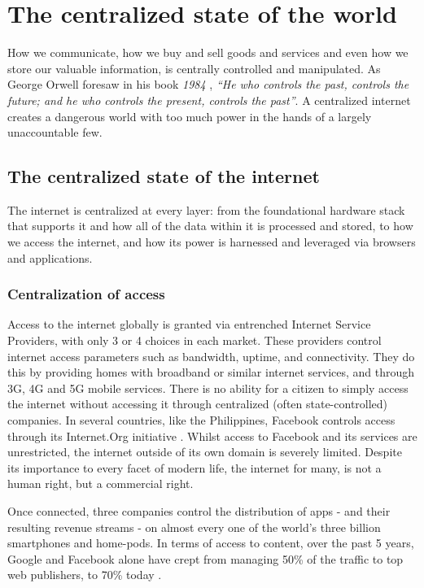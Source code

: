 \section{The centralized state of the world}
\label{sec:intro}
How we communicate, how we buy and sell goods and services and even how we store our valuable information, is centrally controlled and manipulated. As George Orwell foresaw in his book \textit{1984} \cite{orwell2009nineteen}, \textit{``He who controls the past, controls the future; and he who controls the present, controls the past''}. A centralized internet creates a dangerous world with too much power in the hands of a largely unaccountable few.


\subsection{The centralized state of the internet}
\label{sec:introInternet}
The internet is centralized at every layer: from the foundational hardware stack that supports it and how all of the data within it is processed and stored, to how we access the internet, and how its power is harnessed and leveraged via browsers and applications.

\subsubsection{Centralization of access}
\label{sec:introaccess}
Access to the internet globally is granted via entrenched Internet Service Providers, with only 3 or 4 choices in each market. These providers control internet access parameters such as bandwidth, uptime, and connectivity. They do this by providing homes with broadband or similar internet services, and through 3G, 4G and 5G mobile services. There is no ability for a citizen to simply access the internet without accessing it through centralized (often state-controlled) companies. In several countries, like the Philippines, Facebook controls access through its Internet.Org initiative \cite{SoftpediaFace}. Whilst access to Facebook and its services are unrestricted, the internet outside of its own domain is severely limited. Despite its importance to every facet of modern life, the internet for many, is not a human right, but a commercial right.

Once connected, three companies control the distribution of apps - and their resulting revenue streams - on almost every one of the world's three billion smartphones and home-pods. In terms of access to content, over the past 5 years, Google and Facebook alone have crept from managing 50\% of the traffic to top web publishers, to 70\% today \cite{Newsweek2017}.


